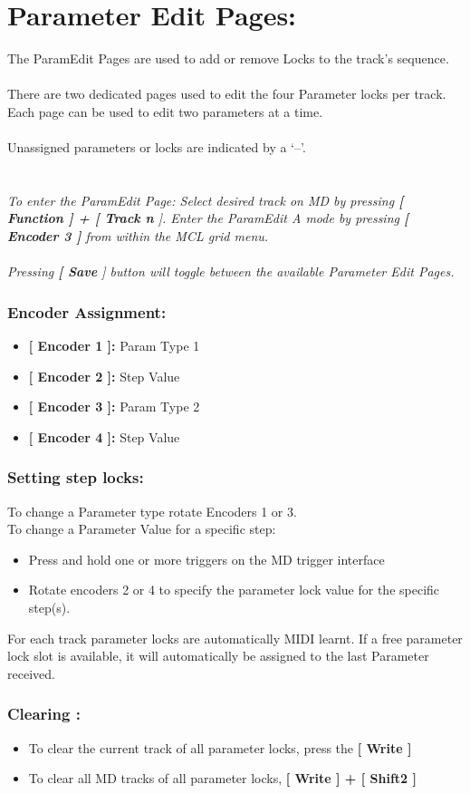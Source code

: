 \chapter{Parameter Edit Pages:}
The ParamEdit Pages are used to add or remove Locks to the track’s sequence.\\
\\
There are two dedicated pages used to edit the four Parameter locks per track.\\
Each page can be used to edit two parameters at a time.\\
\\
Unassigned parameters or locks are indicated by a ‘--’.\\
\\
\\
\textit{To enter the ParamEdit Page: Select desired track on MD by pressing \textbf{[ Function ] + [ Track n }]. Enter the ParamEdit A mode by pressing \textbf{[ Encoder 3 ]} from within the MCL grid menu.}
\\\\
\textit{Pressing \textbf{[ Save }] button will toggle between the available Parameter Edit Pages.}
\subsection{Encoder Assignment:}
\begin{itemize}
	\item \textbf{[ Encoder 1 ]: } Param Type 1
	\item \textbf{[ Encoder 2 ]: } Step Value
	\item \textbf{[ Encoder 3 ]: } Param Type 2
	\item \textbf{[ Encoder 4 ]: } Step Value
\end{itemize}
\subsection{Setting step locks:}
To change a Parameter type rotate Encoders 1 or 3.\\
To change a Parameter Value for a specific step:
\begin{itemize}
\item Press and hold one or more triggers on the MD trigger interface
\item Rotate encoders 2 or 4 to specify the parameter lock value for the specific step(s).
\end{itemize}
For each track parameter locks are automatically MIDI learnt. If a free parameter lock slot is available, it will automatically be assigned to the last Parameter received. 
\subsection{Clearing :}
\begin{itemize}
\item To clear the current track of all parameter locks, press the \textbf{[ Write  ]}
\item To clear all MD tracks of all parameter locks, \textbf{[ Write ] + [ Shift2 ]}
\end{itemize}